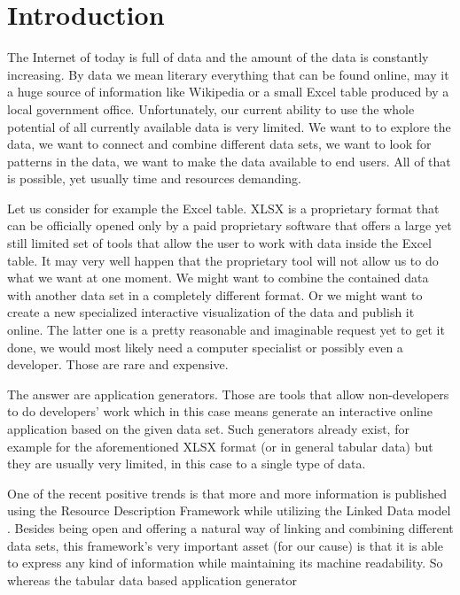 \chapter*{Introduction}

The Internet of today is full of data and the amount of the data is constantly increasing. By data we mean literary everything that can be found online, may it a huge source of information like Wikipedia or a small Excel table produced by a local government office. Unfortunately, our current ability to use the whole potential of all currently available data is very limited. We want to to explore the data, we want to connect and combine different data sets, we want to look for patterns in the data, we want to make the data available to end users. All of that is possible, yet usually time and resources demanding. 

Let us consider for example the Excel table.  XLSX is a proprietary format that can be officially opened only by a paid proprietary software that offers a large yet still limited set of tools that allow the user to work with data inside the Excel table. It may very well happen that the proprietary tool will not allow us to do what we want at one moment. We might want to combine the contained data with another data set in a completely different format. Or we might want to create a new specialized interactive visualization of the data and publish it online. The latter one is  a pretty reasonable and imaginable request yet to get it done, we would most likely need a computer specialist or possibly even a developer. Those are rare and expensive.

The answer are application generators. Those are tools that allow non-developers to do developers' work which in this case means generate an interactive online application based on the given data set. Such generators already exist, for example for the aforementioned XLSX format (or in general tabular data) but they are usually very limited, in this case to a single type of data.

One of the recent positive trends is that more and more information is published using the Resource Description Framework \cite{rdf} while utilizing the Linked Data model \cite{ld}. Besides being open and offering a natural way of linking and combining different data sets, this framework's very important asset (for our cause) is that it is able to express any kind of information while maintaining its machine readability. So whereas the tabular data based application generator 